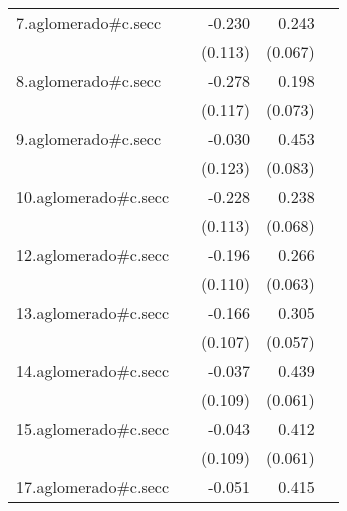 {\begin{longtable}{l*{4}{D{.}{.}{-1}}}
\addlinespace
7.aglomerado#c.secc&                     &      -0.230\sym{*}  &       0.243\sym{***}&                     \\
            &                     &     (0.113)         &     (0.067)         &                     \\
\addlinespace
8.aglomerado#c.secc&                     &      -0.278\sym{*}  &       0.198\sym{**} &                     \\
            &                     &     (0.117)         &     (0.073)         &                     \\
\addlinespace
9.aglomerado#c.secc&                     &      -0.030         &       0.453\sym{***}&                     \\
            &                     &     (0.123)         &     (0.083)         &                     \\
\addlinespace
10.aglomerado#c.secc&                     &      -0.228\sym{*}  &       0.238\sym{***}&                     \\
            &                     &     (0.113)         &     (0.068)         &                     \\
\addlinespace
12.aglomerado#c.secc&                     &      -0.196         &       0.266\sym{***}&                     \\
            &                     &     (0.110)         &     (0.063)         &                     \\
\addlinespace
13.aglomerado#c.secc&                     &      -0.166         &       0.305\sym{***}&                     \\
            &                     &     (0.107)         &     (0.057)         &                     \\
\addlinespace
14.aglomerado#c.secc&                     &      -0.037         &       0.439\sym{***}&                     \\
            &                     &     (0.109)         &     (0.061)         &                     \\
\addlinespace
15.aglomerado#c.secc&                     &      -0.043         &       0.412\sym{***}&                     \\
            &                     &     (0.109)         &     (0.061)         &                     \\
\addlinespace
17.aglomerado#c.secc&                     &      -0.051         &       0.415\sym{***}&                     \\

\end{longtable}}
